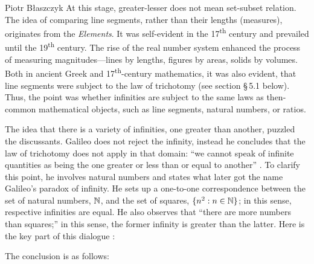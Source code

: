 \begin{artengenv}{Piotr Błaszczyk}
At this stage, greater-lesser does not mean set-subset relation. The idea of comparing line segments, rather than their lengths (measures), originates from the \textit{Elements}. It was self-evident in the 17\textsuperscript{th} century and prevailed until the 19\textsuperscript{th} century. The rise of the real number system enhanced the process of measuring 
magnitudes---lines by lengths, figures by areas, solids by volumes.  
Both in ancient Greek and 17\textsuperscript{th}-century mathematics, it was also evident,  that line segments were subject to the law of trichotomy (see section \S\,5.1 below). Thus, the point was whether infinities are subject to the same laws as then-common mathematical objects, such as line segments,  natural numbers, or ratios.

The idea that there is a variety of infinities,  one greater than another, puzzled the discussants.  Galileo  does not  reject the infinity, instead  he concludes that the law of  trichotomy does not apply in that domain:
``we cannot speak of infinite quantities as being the one greater or less than or equal to another'' \parencite[30]{ref_GG56}. 
To clarify this point, he involves natural numbers and states what later got the name Galileo's paradox of infinity.   
He sets up a one-to-one correspondence between the set of natural numbers, ${\mathbb{N}}$, and the set of squares, $\{n^2: n\in{\mathbb{N}}\}$; in this sense, respective infinities  are equal.
 He also observes that ``there are more numbers than squares;'' in this sense, the former infinity is greater than the latter.  Here is the key part of this dialogue \parencite[33]{ref_GG56}:
 

The conclusion is as follows: 



\end{artengenv}
